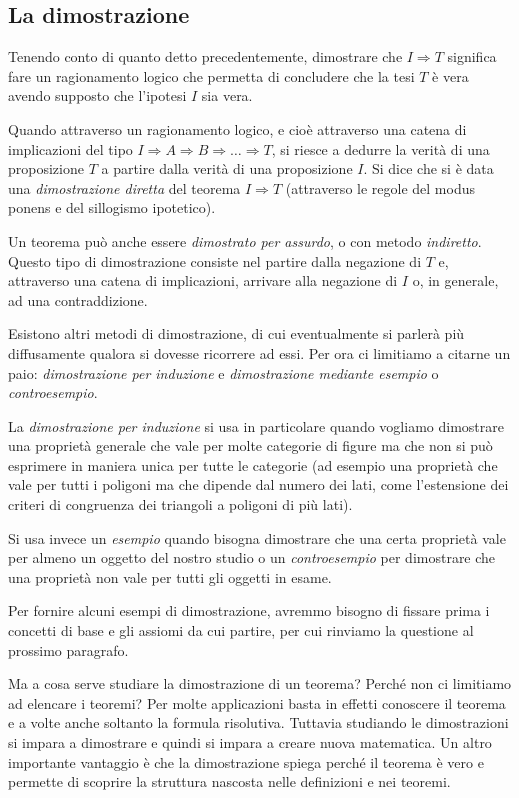 \subsection{La dimostrazione}

Tenendo conto di quanto detto precedentemente, dimostrare che $I\Rightarrow T$ significa fare un ragionamento logico che permetta di concludere che la tesi $T$ è vera avendo supposto che l'ipotesi $I$ sia vera.

Quando attraverso un ragionamento logico, e cioè attraverso una catena di implicazioni del tipo  $I\Rightarrow A\Rightarrow B\Rightarrow \ldots{} \Rightarrow T$, si riesce a dedurre la verità di una proposizione $T$ a partire dalla verità di una proposizione $I$. Si dice che si è data una \emph{dimostrazione diretta} del teorema $I\Rightarrow T$ (attraverso le regole del modus ponens e del sillogismo ipotetico).

Un teorema può anche essere \emph{dimostrato per assurdo}, o con metodo \emph{indiretto}. Questo tipo di dimostrazione consiste nel partire dalla negazione di $T$ e, attraverso una catena di implicazioni, arrivare alla negazione di $I$ o, in generale, ad una contraddizione.

Esistono altri metodi di dimostrazione, di cui eventualmente si parlerà più diffusamente qualora si dovesse ricorrere ad essi. Per ora ci limitiamo a citarne un paio: \emph{dimostrazione per induzione} e \emph{dimostrazione mediante esempio} o \emph{controesempio}.

La \emph{dimostrazione per induzione} si usa in particolare quando vogliamo dimostrare una proprietà generale che vale per molte categorie di figure ma che non si può esprimere in maniera unica per tutte le categorie (ad esempio una proprietà che vale per tutti i poligoni ma che dipende dal numero dei lati, come l'estensione dei criteri di congruenza dei triangoli a poligoni di più lati).

Si usa invece un \emph{esempio} quando bisogna dimostrare che una certa proprietà vale per almeno un oggetto del nostro studio o un \emph{controesempio} per dimostrare che una proprietà non vale per tutti gli oggetti in esame.

Per fornire alcuni esempi di dimostrazione, avremmo bisogno di fissare prima i concetti di base e gli assiomi da cui partire, per cui rinviamo la questione al prossimo paragrafo.

Ma a cosa serve studiare la dimostrazione di un teorema? Perché non ci limitiamo ad elencare i teoremi? Per molte applicazioni basta in effetti conoscere il teorema e a volte anche soltanto la formula risolutiva. Tuttavia studiando le dimostrazioni si impara a dimostrare e quindi si impara a creare nuova matematica. Un altro importante vantaggio è che la dimostrazione spiega perché il teorema è vero e permette di scoprire la struttura nascosta nelle definizioni e nei teoremi.

